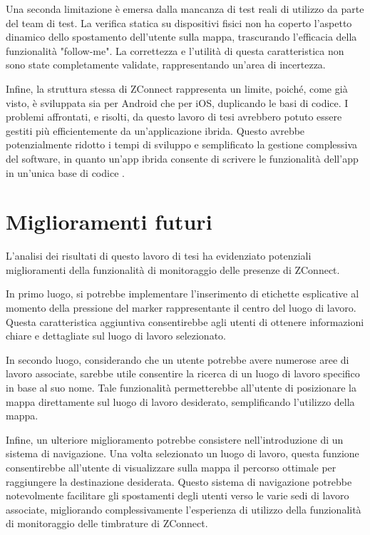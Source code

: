 Una seconda limitazione è emersa dalla mancanza di test reali di utilizzo da parte del team di test. La verifica statica su dispositivi fisici non ha coperto l'aspetto dinamico dello spostamento dell'utente sulla mappa, trascurando l'efficacia della funzionalità "follow-me". La correttezza e l'utilità di questa caratteristica non sono state completamente validate, rappresentando un'area di incertezza.

Infine, la struttura stessa di ZConnect rappresenta un limite, poiché, come già visto, è sviluppata sia per Android che per iOS, duplicando le basi di codice. I problemi affrontati, e risolti, da questo lavoro di tesi avrebbero potuto essere gestiti più efficientemente da un'applicazione ibrida. Questo avrebbe potenzialmente ridotto i tempi di sviluppo e semplificato la gestione complessiva del software, in quanto un'app ibrida consente di scrivere le funzionalità dell'app in un'unica base di codice \cite{AppNative}.  

\section{Miglioramenti futuri}
L'analisi dei risultati di questo lavoro di tesi ha evidenziato potenziali miglioramenti della funzionalità di monitoraggio delle presenze di ZConnect.

In primo luogo, si potrebbe implementare l'inserimento di etichette esplicative al momento della pressione del marker rappresentante il centro del luogo di lavoro. Questa caratteristica aggiuntiva consentirebbe agli utenti di ottenere informazioni chiare e dettagliate sul luogo di lavoro selezionato.

In secondo luogo, considerando che un utente potrebbe avere numerose aree di lavoro associate, sarebbe utile consentire la ricerca di un luogo di lavoro specifico in base al suo nome. Tale funzionalità permetterebbe all'utente di posizionare la mappa direttamente sul luogo di lavoro desiderato, semplificando l'utilizzo della mappa.

Infine, un ulteriore miglioramento potrebbe consistere nell'introduzione di un sistema di navigazione. Una volta selezionato un luogo di lavoro, questa funzione consentirebbe all'utente di visualizzare sulla mappa il percorso ottimale per raggiungere la destinazione desiderata. Questo sistema di navigazione potrebbe notevolmente facilitare gli spostamenti degli utenti verso le varie sedi di lavoro associate, migliorando complessivamente l'esperienza di utilizzo della funzionalità di monitoraggio delle timbrature di ZConnect.